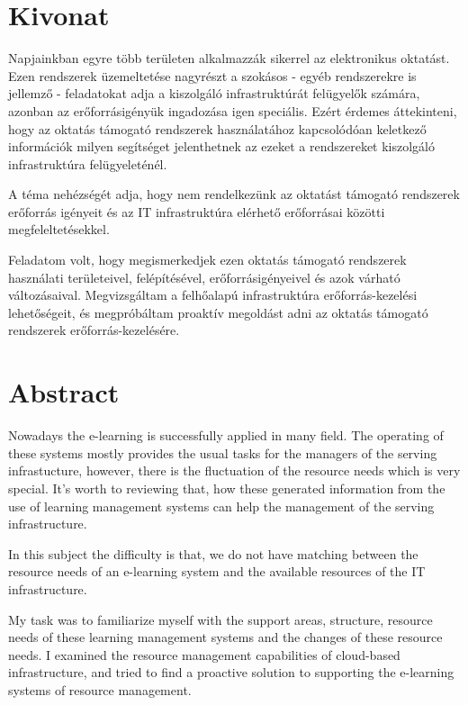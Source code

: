 \chapter*{Kivonat}

Napjainkban egyre több területen alkalmazzák sikerrel az elektronikus oktatást. Ezen rendszerek üzemeltetése nagyrészt a szokásos - egyéb rendszerekre is jellemző - feladatokat adja a kiszolgáló infrastruktúrát felügyelők számára, azonban az erőforrásigényük ingadozása igen speciális. Ezért érdemes áttekinteni, hogy az oktatás támogató rendszerek használatához kapcsolódóan keletkező információk milyen segítséget jelenthetnek az ezeket a rendszereket kiszolgáló infrastruktúra felügyeleténél.

A téma nehézségét adja, hogy nem rendelkezünk az oktatást támogató rendszerek erőforrás igényeit és az IT infrastruktúra elérhető erőforrásai közötti megfeleltetésekkel.

Feladatom volt, hogy megismerkedjek ezen oktatás támogató rendszerek használati területeivel, felépítésével, erőforrásigényeivel és azok várható változásaival. Megvizsgáltam a felhőalapú infrastruktúra erőforrás-kezelési lehetőségeit, és megpróbáltam proaktív megoldást adni az oktatás támogató rendszerek erőforrás-kezelésére.
\vfill

\chapter*{Abstract}

Nowadays the e-learning is successfully applied in many field. The operating of these systems mostly provides the usual tasks for the managers of the serving infrastucture, however, there is the fluctuation of the resource needs which is very special. It's worth to reviewing that, how these generated information from the use of learning management systems can help the management of the serving infrastructure.

In this subject the difficulty is that, we do not have matching between the resource needs of an e-learning system and the available resources of the IT infrastructure.

My task was to familiarize myself with the support areas, structure, resource needs of these learning management systems and the changes of these resource needs. I examined the resource management capabilities of cloud-based infrastructure, and tried to find a proactive solution to supporting the e-learning systems of resource management.

\vfill

